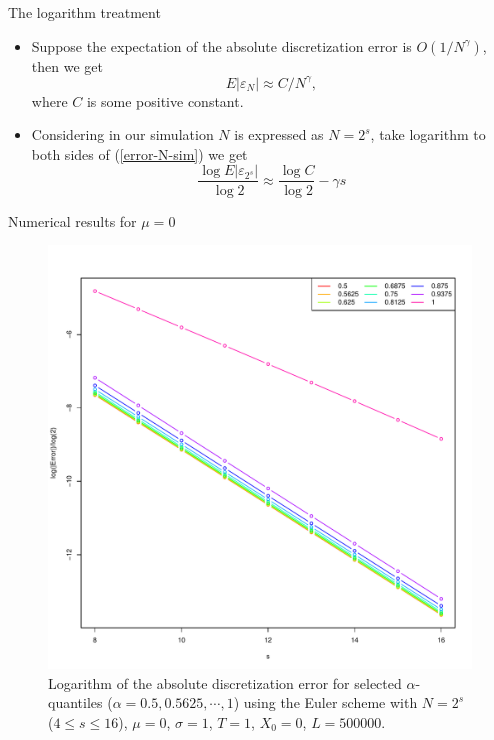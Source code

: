 \documentclass[cjk,10pt]{beamer}
\begin{document}
\begin{frame}{The logarithm treatment}
\begin{itemize}
\item
Suppose the expectation of the absolute discretization error is $O(1/N^\gamma)$, then we get
\begin{equation}\label{error-N-sim}
E|\varepsilon_N| \approx C/N^\gamma,
\end{equation}
where $C$ is some positive constant. 
\item
Considering in our simulation $N$ is expressed as $N = 2^s$, take logarithm to both sides of (\ref{error-N-sim}) we get
\begin{equation}
\frac{\log E|\varepsilon_{2^s}|}{\log 2} \approx \frac{\log C}{\log 2} -\gamma s
\end{equation}
\end{itemize}
\end{frame}


\begin{frame}{Numerical results for $\mu=0$}
 \begin{figure}
   \includegraphics[scale=0.3]{nout_0alog.pdf}
   \caption{Logarithm of the absolute discretization error for selected $\alpha$-quantiles ($\alpha = 0.5, 0.5625, \cdots, 1$) using the Euler scheme with $N = 2^s$ ($4\le s \le 16$), $\mu=0$, $\sigma=1$, $T=1$, $X_0=0$, $L=500000$.} 
   \label{f:lab}
\end{figure}
\end{frame}
\end{document}
